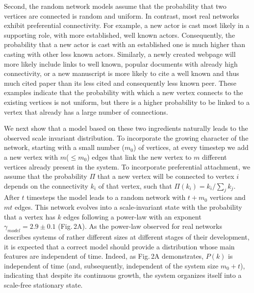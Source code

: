 Second, the random network models assume that the probability that two vertices are connected is random and uniform. In contrast, most real networks exhibit preferential connectivity. For example, a new actor is cast most likely in a supporting role, with more established, well known actors. Consequently, the probability that a new actor is cast with an established one is much higher than casting with other less known actors. Similarly, a newly created webpage will more likely include links to well known, popular documents with already high connectivity, or a new manuscript is more likely to cite a well known and thus much cited paper than its less cited and consequently less known peer. These examples indicate that the probability with which a new vertex connects to the existing vertices is not uniform, but there is a higher probability to be linked to a vertex that already has a large number of connections.

We next show that a model based on these two ingredients naturally leads to the observed scale invariant distribution. To incorporate the growing character of the network, starting with a small number ($m_0$) of vertices, at every timestep we add a new vertex with $m$($\leq m_0$) edges that link the new vertex to $m$ different vertices already present in the system. To incorporate preferential attachment, we assume that the probability $\Pi$ that a new vertex will be connected to vertex $i$ depends on the connectivity $k_i$ of that vertex, such that $\Pi(k_i)=k_i/\sum_j k_j$. After $t$ timesteps the model leads to a random network with $t+m_0$ vertices and $mt$ edges. This network evolves into a scale-invariant state with the probability that a vertex has $k$ edges following a power-law with an exponent $\gamma_{model}=2.9\pm 0.1$ (Fig.$\,$2A). As the power-law observed for real networks describes systems of rather different sizes at different stages of their development, it is expected that a correct model should provide a distribution whose main features are independent of time. Indeed, as Fig.$\,$2A demonstrates, $P(k)$ is independent of time (and, subsequently, independent of the system size $m_0+t$), indicating that despite its continuous growth, the system organizes itself into a scale-free stationary state.

